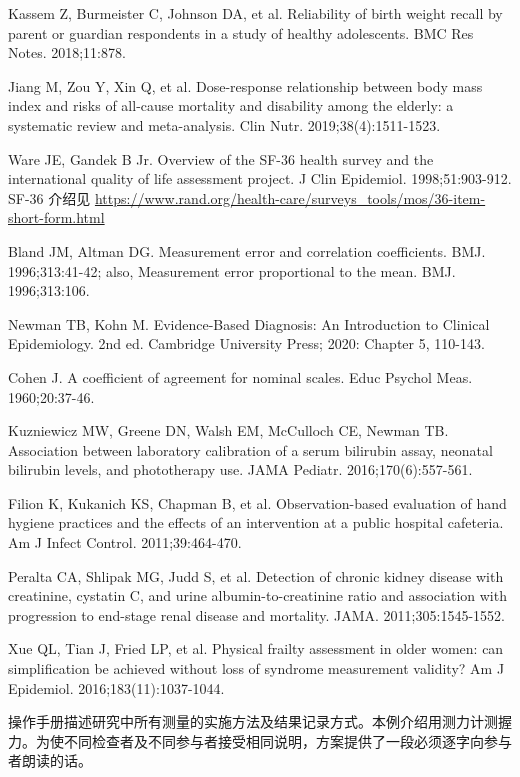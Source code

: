 \begin{references}
\item Kassem Z, Burmeister C, Johnson DA, et al. Reliability of birth weight recall by parent or guardian respondents in a study of healthy adolescents. BMC Res Notes. 2018;11:878.
\item Jiang M, Zou Y, Xin Q, et al. Dose-response relationship between body mass index and risks of all-cause mortality and disability among the elderly: a systematic review and meta-analysis. Clin Nutr. 2019;38(4):1511-1523.
\item Ware JE, Gandek B Jr. Overview of the SF-36 health survey and the international quality of life assessment project. J Clin Epidemiol. 1998;51:903-912. SF-36 介绍见 \url{https://www.rand.org/health-care/surveys_tools/mos/36-item-short-form.html}
\item Bland JM, Altman DG. Measurement error and correlation coefficients. BMJ. 1996;313:41-42; also, Measurement error proportional to the mean. BMJ. 1996;313:106.
\item Newman TB, Kohn M. Evidence-Based Diagnosis: An Introduction to Clinical Epidemiology. 2nd ed. Cambridge University Press; 2020: Chapter 5, 110-143.
\item Cohen J. A coefficient of agreement for nominal scales. Educ Psychol Meas. 1960;20:37-46.
\item Kuzniewicz MW, Greene DN, Walsh EM, McCulloch CE, Newman TB. Association between laboratory calibration of a serum bilirubin assay, neonatal bilirubin levels, and phototherapy use. JAMA Pediatr. 2016;170(6):557-561.
\item Filion K, Kukanich KS, Chapman B, et al. Observation-based evaluation of hand hygiene practices and the effects of an intervention at a public hospital cafeteria. Am J Infect Control. 2011;39:464-470.
\item Peralta CA, Shlipak MG, Judd S, et al. Detection of chronic kidney disease with creatinine, cystatin C, and urine albumin-to-creatinine ratio and association with progression to end-stage renal disease and mortality. JAMA. 2011;305:1545-1552.
\item Xue QL, Tian J, Fried LP, et al. Physical frailty assessment in older women: can simplification be achieved without loss of syndrome measurement validity? Am J Epidemiol. 2016;183(11):1037-1044.
\end{references}
操作手册描述研究中所有测量的实施方法及结果记录方式。本例介绍用测力计测握力。为使不同检查者及不同参与者接受相同说明，方案提供了一段必须逐字向参与者朗读的话。

